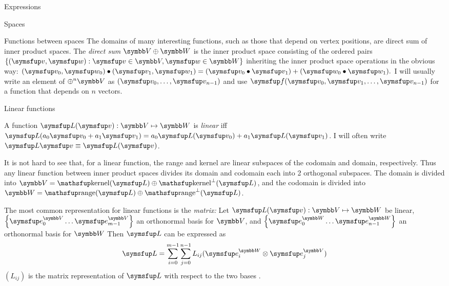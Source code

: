 \documentclass[12pt]{PalisadesLakesArticle}
\begin{document}
\begin{plSection}{Expressions}
\begin{plSection}{Spaces}
\begin{plSection}{Functions between spaces}
The domains of many interesting functions,
such as those that depend on vertex positions,
are direct sum of inner product spaces.
The \textit{direct sum} $\Space{V} \oplus \Space{W}$ is the inner product space
consisting of the ordered pairs 
$\left\{ (\Vector{v},\Vector{w}) : 
\Vector{v} \in \Space{V}, \Vector{w} \in \Space{W} \right\}$
inheriting the inner product space operations in the obvious way:
$(\Vector{v}_0,\Vector{w}_0) \bullet (\Vector{v}_1,\Vector{w}_1) 
= (\Vector{v}_0 \bullet \Vector{v}_1) 
+ (\Vector{w}_0 \bullet \Vector{w}_1).$
I will usually write an element of $\oplus^n \Space{V}$ as
$(\Vector{v}_0,\ldots,\Vector{v}_{n-1})$
and use
$\Vector{f}(\Vector{v}_0,\Vector{v}_1,\ldots,\Vector{v}_{n-1})$
for a function that depends on $n$ vectors.

\begin{plSection}{Linear functions}
\label{sec:linear-functions}

A function $\Vector{L}(\Vector{v}):\Space{V} \mapsto \Space{W}$
is \textit{linear} iff
$\Vector{L}(a_0 \Vector{v}_0 + a_1 \Vector{v}_1) 
= a_0 \Vector{L}(\Vector{v}_0) + a_1 \Vector{L}(\Vector{v}_1)$.
I will often write
 $\Vector{L}\Vector{v} \equiv \Vector{L}(\Vector{v})$.

It is not hard to see that, for a linear function,
the range and kernel are linear subspaces of the codomain and
domain, respectively.
Thus any linear function between inner product spaces
divides its domain and codomain each into 2 orthogonal subspaces.
The domain is divided into 
$\Space{V} = \kernel(\Vector{L}) \oplus \kernel^{\perp}(\Vector{L})$,
and the codomain is divided into 
$\Space{W} = \range(\Vector{L}) \oplus \range^{\perp}(\Vector{L})$.

The most common representation for linear functions is the \textit{matrix:}
Let $\Vector{L}(\Vector{v}):\Space{V} \mapsto \Space{W}$ be linear,
$\left\{ \Vector{e}_0^{\Space{V}} \ldots  \Vector{e}_{m-1}^{\Space{V}} \right\}$ 
an orthonormal basis for $\Space{V}$,
and
$\left\{ \Vector{e}_0^{\Space{W}} \ldots \Vector{e}_{n-1}^{\Space{W}} \right\}$ 
an orthonormal  basis for $\Space{W}$
Then $\Vector{L}$ can be expressed as
\begin{equation}
\Vector{L}
 =
\sum_{i=0}^{m-1} \sum_{j=0}^{n-1} L_{ij}
 ( \Vector{e}_i^{\Space{W}} \otimes \Vector{e}_j^{\Space{V}} )
\end{equation}
$(L_{ij})$ is the matrix representation of $\Vector{L}$ with respect to
the two bases .


\end{plSection}
\end{plSection}
\end{plSection}
\end{plSection}
\end{document}
